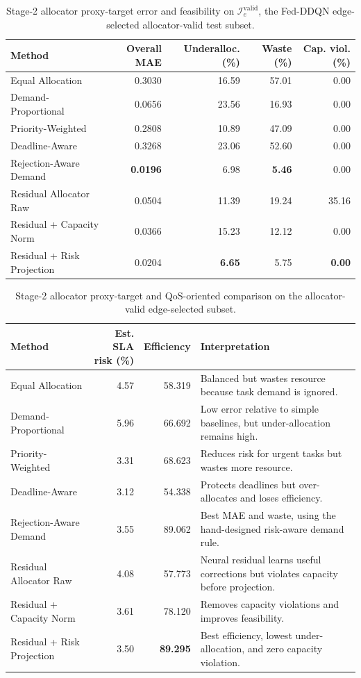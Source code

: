 \begin{table}[!t]
\centering
\caption{Stage-2 allocator proxy-target error and feasibility on $\mathcal{I}^{\mathrm{valid}}_e$, the Fed-DDQN edge-selected allocator-valid test subset.}
\label{tab:allocator_results}
\small
\setlength{\tabcolsep}{5pt}
\begin{tabular}{@{}lrrrr@{}}
\toprule
Method & Overall MAE & Underalloc. (\%) & Waste (\%) & Cap. viol. (\%) \\
\midrule
Equal Allocation & 0.3030 & 16.59 & 57.01 & 0.00 \\
Demand-Proportional & 0.0656 & 23.56 & 16.93 & 0.00 \\
Priority-Weighted & 0.2808 & 10.89 & 47.09 & 0.00 \\
Deadline-Aware & 0.3268 & 23.06 & 52.60 & 0.00 \\
Rejection-Aware Demand & \textbf{0.0196} & 6.98 & \textbf{5.46} & 0.00 \\
Residual Allocator Raw & 0.0504 & 11.39 & 19.24 & 35.16 \\
Residual + Capacity Norm & 0.0366 & 15.23 & 12.12 & 0.00 \\
Residual + Risk Projection & 0.0204 & \textbf{6.65} & 5.75 & \textbf{0.00} \\
\bottomrule
\end{tabular}
\end{table}

\begin{table}[!t]
\centering
\caption{Stage-2 allocator proxy-target and QoS-oriented comparison on the allocator-valid edge-selected subset.}
\label{tab:allocator_qos}
\small
\setlength{\tabcolsep}{5pt}
\begin{tabularx}{\textwidth}{@{}lrrX@{}}
\toprule
Method & Est. SLA risk (\%) & Efficiency & Interpretation \\
\midrule
Equal Allocation & 4.57 & 58.319 & Balanced but wastes resource because task demand is ignored. \\
Demand-Proportional & 5.96 & 66.692 & Low error relative to simple baselines, but under-allocation remains high. \\
Priority-Weighted & 3.31 & 68.623 & Reduces risk for urgent tasks but wastes more resource. \\
Deadline-Aware & 3.12 & 54.338 & Protects deadlines but over-allocates and loses efficiency. \\
Rejection-Aware Demand & 3.55 & 89.062 & Best MAE and waste, using the hand-designed risk-aware demand rule. \\
Residual Allocator Raw & 4.08 & 57.773 & Neural residual learns useful corrections but violates capacity before projection. \\
Residual + Capacity Norm & 3.61 & 78.120 & Removes capacity violations and improves feasibility. \\
Residual + Risk Projection & 3.50 & \textbf{89.295} & Best efficiency, lowest under-allocation, and zero capacity violation. \\
\bottomrule
\end{tabularx}
\end{table}
